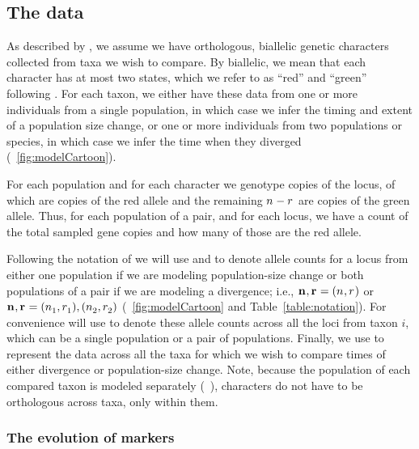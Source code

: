 \subsection{The data}
As described by \citet{Oaks2018ecoevolity},
we assume we have orthologous, biallelic genetic characters collected from
taxa we wish to compare.
By biallelic, we mean that each character has at most two states,
which we refer to as ``red'' and ``green'' following \citet{Bryant2012}.
For each taxon, we either have these data from one or more individuals from a
single population, in which case we infer the timing and extent of a population
size change, or one or more individuals from two populations or species,
in which case we infer the time when they diverged (\fig{}~\ref{fig:modelCartoon}).

For each population and for each character we genotype \allelecount copies
of the locus, \redallelecount of which are copies of the red allele and the
remaining $\allelecount - \redallelecount$ are copies of the green allele.
Thus, for each population of a pair, and for each locus, we have a count of the
total sampled gene copies and how many of those are the red allele.

\ifembed{

}{}

Following the notation of \citet{Oaks2018ecoevolity}
we will use \leafallelecounts and \leafredallelecounts to denote allele counts
for a locus from either one population if we are modeling population-size
change or both populations of a pair if we are modeling a divergence; i.e., 
$\leafallelecounts, \leafredallelecounts = (\allelecount, \redallelecount)$
or
$\leafallelecounts, \leafredallelecounts = (\allelecount[1],
\redallelecount[1]), (\allelecount[2], \redallelecount[2])$
(\fig{}~\ref{fig:modelCartoon}
and
Table~\ref{table:notation}).
For convenience will use \comparisondata[i] to denote these allele counts
across all the loci from taxon $i$, which can be a single population
or a pair of populations.
Finally, we use \alldata to represent the data across all the taxa for which we
wish to compare times of either divergence or population-size change.
Note, because the population of each compared taxon is modeled separately
(\fig{}~),
characters do not have to be orthologous across taxa, only within them.


\subsubsection{The evolution of markers}


